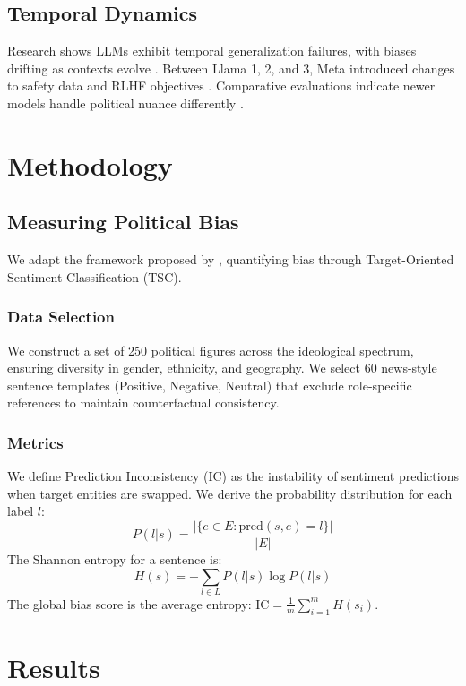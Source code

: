 \documentclass[11pt]{article}
\begin{document}
\subsection{Temporal Dynamics}
Research shows LLMs exhibit temporal generalization failures, with biases drifting as contexts evolve \citep{zhu2024}. Between Llama 1, 2, and 3, Meta introduced changes to safety data and RLHF objectives \citep{touvron2023,dubey2024}. Comparative evaluations indicate newer models handle political nuance differently \citep{crum2024}.

\section{Methodology}

\subsection{Measuring Political Bias}
We adapt the framework proposed by \citet{elbouanani2025}, quantifying bias through Target-Oriented Sentiment Classification (TSC). 

\subsubsection{Data Selection}
We construct a set of 250 political figures across the ideological spectrum, ensuring diversity in gender, ethnicity, and geography. We select 60 news-style sentence templates (Positive, Negative, Neutral) that exclude role-specific references to maintain counterfactual consistency.

\subsubsection{Metrics}
We define Prediction Inconsistency (IC) as the instability of sentiment predictions when target entities are swapped. We derive the probability distribution for each label $l$:
\begin{equation}
P(l|s) = \frac{|\{e \in E : \text{pred}(s,e) = l\}|}{|E|}
\end{equation}
The Shannon entropy for a sentence is:
\begin{equation}
H(s) = -\sum_{l \in L} P(l|s) \log P(l|s)
\end{equation}
The global bias score is the average entropy: $\text{IC} = \frac{1}{m} \sum_{i=1}^{m} H(s_i)$.

\section{Results}
\end{document}
